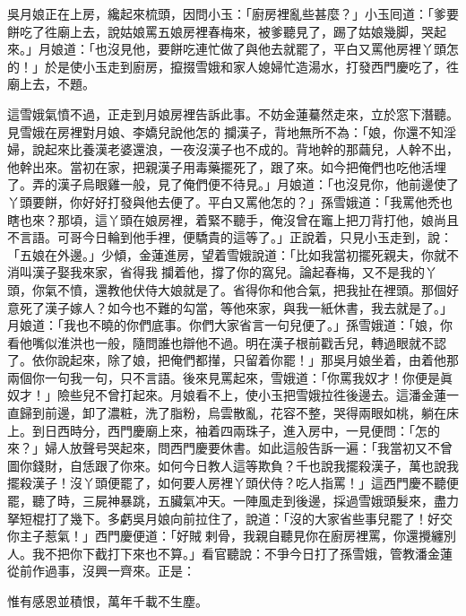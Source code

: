 吳月娘正在上房，纔起來梳頭，因問小玉：「廚房裡亂些甚麼？」小玉囘道：「爹要餅吃了徃廟上去，說姑娘罵五娘房裡春梅來，被爹聽見了，踢了姑娘幾脚，哭起來。」月娘道：「也沒見他，要餅吃連忙做了與他去就罷了，平白又罵他房裡丫頭怎的！」於是使小玉走到廚房，攛掇雪娥和家人媳婦忙造湯水，打發西門慶吃了，徃廟上去，不題。

這雪娥氣憤不過，正走到月娘房裡告訴此事。不妨金蓮驀然走來，立於窓下潛聽。見雪娥在房裡對月娘、李嬌兒說他怎的𢺞攔漢子，背地無所不為：「娘，你還不知淫婦，說起來比養漢老婆還浪，一夜沒漢子也不成的。背地幹的那繭兒，人幹不出，他幹出來。{}當初在家，把親漢子用毒藥擺死了，跟了來。如今把俺們也吃他活埋了。弄的漢子烏眼雞一般，見了俺們便不待見。」月娘道：「也沒見你，他前邊使了丫頭要餅，你好好打發與他去便了。平白又罵他怎的？」孫雪娥道：「我罵他禿也瞎也來？那頃，這丫頭在娘房裡，着緊不聽手，俺沒曾在竈上把刀背打他，{}娘尚且不言語。可哥今日輪到他手裡，便驕貴的這等了。」正說着，只見小玉走到，說：「五娘在外邊。」{}少傾，金蓮進房，望着雪娥說道：「比如我當初擺死親夫，你就不消叫漢子娶我來家，省得我𢺞攔着他，撐了你的窩兒。{}論起春梅，又不是我的丫頭，你氣不憤，還教他伏侍大娘就是了。省得你和他合氣，把我扯在裡頭。那個好意死了漢子嫁人？{}如今也不難的勾當，等他來家，與我一紙休書，我去就是了。」月娘道：「我也不曉的你們底事。你們大家省言一句兒便了。」孫雪娥道：「娘，你看他嘴似淮洪也一般，隨問誰也辯他不過。{}明在漢子根前戳舌兒，轉過眼就不認了。依你說起來，除了娘，把俺們都攆，只留着你罷！」那吳月娘坐着，由着他那兩個你一句我一句，只不言語。後來見罵起來，雪娥道：「你罵我奴才！你便是眞奴才！」險些兒不曾打起來。月娘看不上，使小玉把雪娥拉徃後邊去。這潘金蓮一直歸到前邊，卸了濃粧，洗了脂粉，烏雲散亂，花容不整，哭得兩眼如桃，躺在床上。{}到日西時分，西門慶廟上來，袖着四兩珠子，進入房中，一見便問：「怎的來？」婦人放聲号哭起來，問西門慶要休書。如此這般告訴一遍：「我當初又不曾圖你錢財，自恁跟了你來。如何今日教人這等欺負？千也說我擺殺漢子，萬也說我擺殺漢子！沒丫頭便罷了，如何要人房裡丫頭伏侍？吃人指罵！」這西門慶不聽便罷，聽了時，三屍神暴跳，五臟氣冲天。一陣風走到後邊，採過雪娥頭髮來，盡力{}拏短棍打了幾下。多虧吳月娘向前拉住了，說道：「沒的大家省些事兒罷了！{}好交你主子惹氣！」西門慶便道：「好賊𢱉剌骨，我親自聽見你在廚房裡罵，你還攪纏別人。我不把你下截打下來也不算。」看官聽說：不爭今日打了孫雪娥，管教潘金蓮從前作過事，沒興一齊來。正是：

\begin{myquote}
惟有感恩並積恨，萬年千載不生塵。
\end{myquote}

